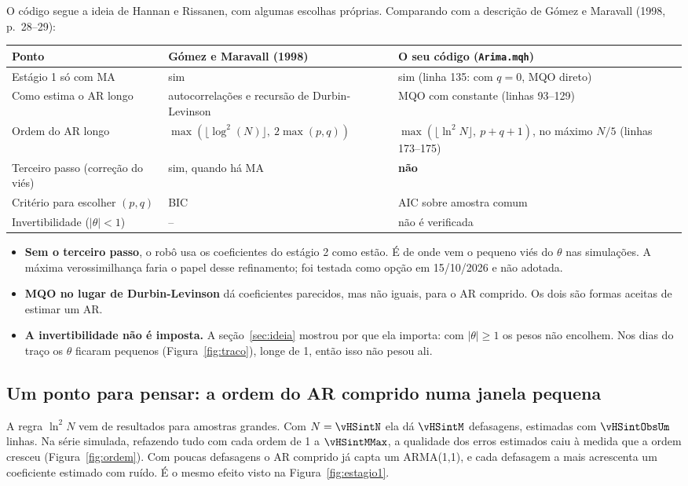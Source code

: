 \documentclass[11pt,a4paper]{article}
\begin{document}
O código segue a ideia de Hannan e Rissanen, com algumas escolhas próprias. Comparando com a descrição de Gómez e
Maravall (1998, p.~28--29):

\begin{center}\small
\begin{tabular}{>{\raggedright}p{3.2cm} >{\raggedright}p{5.3cm} >{\raggedright\arraybackslash}p{5.6cm}}
\toprule
Ponto & Gómez e Maravall (1998) & O seu código (\texttt{Arima.mqh})\\
\midrule
Estágio 1 só com MA & sim & sim (linha 135: com $q = 0$, MQO direto)\\
Como estima o AR longo & autocorrelações e recursão de Durbin-Levinson & MQO com constante (linhas 93--129)\\
Ordem do AR longo & $\max(\lfloor\log^2(N)\rfloor,\ 2\max(p,q))$ & $\max(\lfloor\ln^2 N\rfloor,\ p+q+1)$, no máximo $N/5$ (linhas 173--175)\\
Terceiro passo (correção do viés) & sim, quando há MA & \textbf{não}\\
Critério para escolher $(p,q)$ & BIC & AIC sobre amostra comum\\
Invertibilidade ($|\theta|<1$) & -- & não é verificada\\
\bottomrule
\end{tabular}
\end{center}

\begin{itemize}[leftmargin=*, itemsep=2pt]
\item \textbf{Sem o terceiro passo}, o robô usa os coeficientes do estágio 2 como estão. É de onde vem o pequeno viés
  do $\theta$ nas simulações. A máxima verossimilhança faria o papel desse refinamento; foi testada como opção em
  15/10/2026 e não adotada.
\item \textbf{MQO no lugar de Durbin-Levinson} dá coeficientes parecidos, mas não iguais, para o AR comprido. Os dois são
  formas aceitas de estimar um AR.
\item \textbf{A invertibilidade não é imposta.} A seção~\ref{sec:ideia} mostrou por que ela importa: com $|\theta| \ge 1$
  os pesos não encolhem. Nos dias do traço os $\theta$ ficaram pequenos (Figura~\ref{fig:traco}), longe de 1, então
  isso não pesou ali.
\end{itemize}

\subsection{Um ponto para pensar: a ordem do AR comprido numa janela pequena}\label{sec:ordem}
A regra $\ln^2 N$ vem de resultados para amostras grandes. Com $N = \vHSintN$ ela dá $\vHSintM$ defasagens, estimadas com
$\vHSintObsUm$ linhas. Na série simulada, refazendo tudo com cada ordem de 1 a $\vHSintMMax$, a qualidade dos erros estimados
caiu à medida que a ordem cresceu (Figura~\ref{fig:ordem}). Com poucas defasagens o AR comprido já capta um ARMA(1,1),
e cada defasagem a mais acrescenta um coeficiente estimado com ruído. É o mesmo efeito visto na Figura~\ref{fig:estagio1}.
\end{document}
